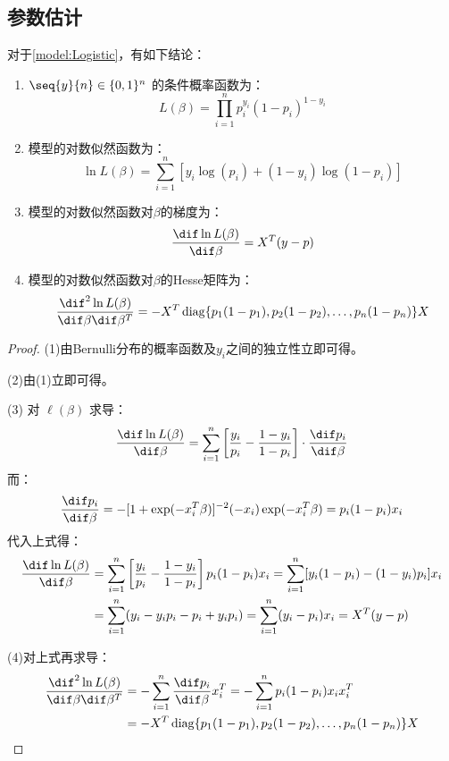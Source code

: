 \subsection{参数估计}
\begin{property}
	对于\cref{model:Logistic}，有如下结论：
	\begin{enumerate}
		\item $\seq{y}{n}\in\{0,1\}^n$ 的条件概率函数为：
		\begin{equation*}
			L(\beta) = \prod_{i=1}^{n} p_i^{y_i}(1-p_i)^{1-y_i}
		\end{equation*}
		\item 模型的对数似然函数为：
		\begin{equation*}
			\ln L(\beta)=\sum_{i=1}^{n} \left[y_i\log(p_i)+(1-y_i)\log(1-p_i)\right]
		\end{equation*}
		\item 模型的对数似然函数对$\beta$的梯度为：
		\begin{equation*}
			\frac{\dif\ln L(\beta)}{\dif\beta} = X^T(y - p)
		\end{equation*}
		\item 模型的对数似然函数对$\beta$的Hesse矩阵为：
		\begin{equation*}
			\frac{\dif^2\ln L(\beta)}{\dif\beta\dif\beta^T}=-X^T\operatorname{diag}\{p_1(1-p_1),p_2(1-p_2),\dots,p_n(1-p_n)\}X
		\end{equation*}
	\end{enumerate}
\end{property}
\begin{proof}
	(1)由Bernulli分布的概率函数及$y_i$之间的独立性立即可得。\par
	(2)由(1)立即可得。\par
	(3) 对 $\ell(\beta)$ 求导：
	\[
	\frac{\dif\ln L(\beta)}{\dif \beta}
	= \sum_{i=1}^n \left[ \frac{y_i}{p_i} - \frac{1 - y_i}{1 - p_i} \right] \cdot \frac{\dif p_i}{\dif \beta}
	\]
	而：
	\[
	\frac{\dif p_i}{\dif \beta}=-[1+\exp(-x_i^T\beta)]^{-2}(-x_i)\exp(-x_i^T\beta)=p_i(1 - p_i) x_i
	\]
	代入上式得：
	\begin{align*}
		\frac{\dif\ln L(\beta)}{\dif \beta}&=\sum_{i=1}^{n}\left[\frac{y_i}{p_i}-\frac{1-y_i}{1-p_i}\right]p_i(1-p_i)x_i=\sum_{i=1}^{n}[y_i(1-p_i)-(1-y_i)p_i]x_i \\
		&=\sum_{i=1}^{n}(y_i-y_ip_i-p_i+y_ip_i)=\sum_{i=1}^n (y_i - p_i)x_i = X^T(y - p)
	\end{align*}\par
	(4)对上式再求导：
	\begin{align*}
		\frac{\dif^2 \ln L(\beta)}{\dif \beta \dif \beta^T}
		&=-\sum_{i=1}^{n}\frac{\dif p_i}{\dif\beta}x_i^T=-\sum_{i=1}^{n}p_i(1-p_i)x_ix_i^T \\
		&=-X^T\operatorname{diag}\{p_1(1-p_1),p_2(1-p_2),\dots,p_n(1-p_n)\}X\qedhere
	\end{align*}
\end{proof}